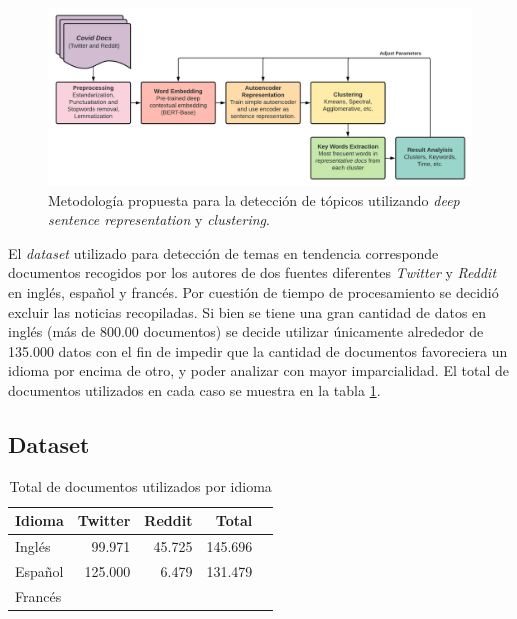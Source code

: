 
\begin{figure}[H]
    \centering
    \includegraphics[width=\textwidth]{doc_hw04/images/TopicDetectionDiag.png}
    \caption{Metodología propuesta para la detección de tópicos utilizando \textit{deep sentence representation} y \textit{clustering}.}
    \label{fig:TopicDetectionDiag}
\end{figure}

El \textit{dataset} utilizado para detección de temas en tendencia corresponde documentos recogidos por los autores de dos fuentes diferentes \textit{Twitter} y \textit{Reddit} en inglés, español y francés. Por cuestión de tiempo de procesamiento se decidió excluir las noticias recopiladas. Si bien se tiene una gran cantidad de datos en inglés (más de 800.00 documentos) se decide utilizar únicamente alrededor de 135.000 datos con el fin de impedir que la cantidad de documentos favoreciera un idioma por encima de otro, y poder analizar con mayor imparcialidad. El total de documentos utilizados en cada caso se muestra en la tabla \ref{tab:docs}.
\subsection{Dataset}

\begin{table}[H]
\centering
\caption{Total de documentos utilizados por idioma}
\label{tab:docs}
\begin{tabular}{lrrrr}
\hline
\textbf{Idioma} & \textbf{Twitter} & \textbf{Reddit} & \textbf{Total} \\ \hline
Inglés          & 99.971           & 45.725          & 145.696        \\
Español         & 125.000          & 6.479           & 131.479        \\
Francés         &                  &                 &                \\ \hline
\end{tabular}
\end{table}

